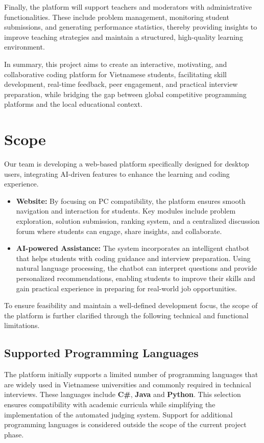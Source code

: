 Finally, the platform will support teachers and moderators with administrative functionalities. These include problem management, monitoring student submissions, and generating performance statistics, thereby providing insights to improve teaching strategies and maintain a structured, high-quality learning environment.

In summary, this project aims to create an interactive, motivating, and collaborative coding platform for Vietnamese students, facilitating skill development, real-time feedback, peer engagement, and practical interview preparation, while bridging the gap between global competitive programming platforms and the local educational context.

\section{Scope}

Our team is developing a web-based platform specifically designed for desktop users, integrating AI-driven features to enhance the learning and coding experience.

\begin{itemize}
    \item \textbf{Website:} By focusing on PC compatibility, the platform ensures smooth navigation and interaction for students. Key modules include problem exploration, solution submission, ranking system, and a centralized discussion forum where students can engage, share insights, and collaborate.
    \item \textbf{AI-powered Assistance:} The system incorporates an intelligent chatbot that helps students with coding guidance and interview preparation. Using natural language processing, the chatbot can interpret questions and provide personalized recommendations, enabling students to improve their skills and gain practical experience in preparing for real-world job opportunities.
\end{itemize}

To ensure feasibility and maintain a well-defined development focus, the scope of the platform is further clarified through the following technical and functional limitations.

\subsection*{Supported Programming Languages}

The platform initially supports a limited number of programming languages that are widely used in Vietnamese universities and commonly required in technical interviews. These languages include \textbf{C\#}, \textbf{Java} and \textbf{Python}. This selection ensures compatibility with academic curricula while simplifying the implementation of the automated judging system. Support for additional programming languages is considered outside the scope of the current project phase.

